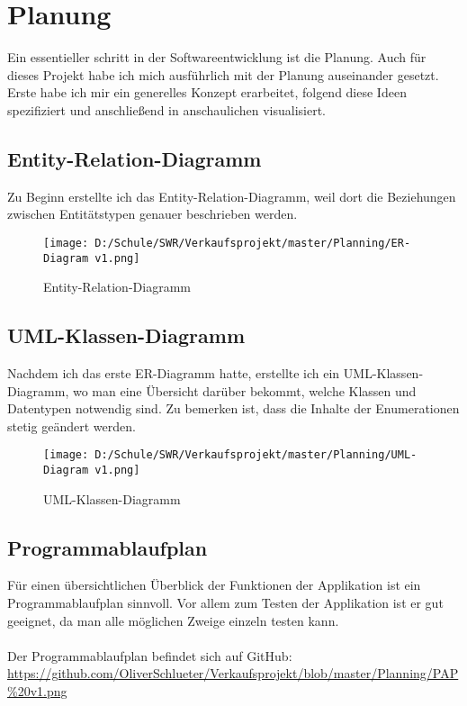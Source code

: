 \chapter{Planung}

Ein essentieller schritt in der Softwareentwicklung ist die Planung. Auch für dieses Projekt habe ich mich ausführlich mit der Planung auseinander gesetzt. Erste habe ich mir ein generelles Konzept erarbeitet, folgend diese Ideen spezifiziert und anschließend in anschaulichen visualisiert.

\section{Entity-Relation-Diagramm}
Zu Beginn erstellte ich das Entity-Relation-Diagramm, weil dort die Beziehungen zwischen Entitätstypen genauer beschrieben werden. 

\begin{figure}[h]
\texttt{[image: D:/Schule/SWR/Verkaufsprojekt/master/Planning/ER-Diagram v1.png]}
\caption{Entity-Relation-Diagramm}
\end{figure}

\newpage
\section{UML-Klassen-Diagramm}

Nachdem ich das erste ER-Diagramm hatte, erstellte ich ein UML-Klassen-Diagramm, wo man eine Übersicht darüber bekommt, welche Klassen und Datentypen notwendig sind. Zu bemerken ist, dass die Inhalte der Enumerationen stetig geändert werden.

\begin{figure}[h]
\texttt{[image: D:/Schule/SWR/Verkaufsprojekt/master/Planning/UML-Diagram v1.png]}
\caption{UML-Klassen-Diagramm}
\end{figure}

\newpage
\section{Programmablaufplan}

Für einen übersichtlichen Überblick der Funktionen der Applikation ist ein Programmablaufplan sinnvoll. Vor allem zum Testen der Applikation ist er gut geeignet, da man alle möglichen Zweige einzeln testen kann.\\
\\Der Programmablaufplan befindet sich auf GitHub: \url{https://github.com/OliverSchlueter/Verkaufsprojekt/blob/master/Planning/PAP%20v1.png}

